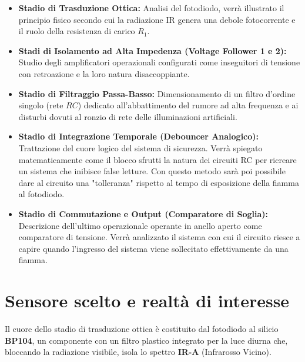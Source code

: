 \documentclass[12pt,a4paper]{article}
\begin{document}
    \begin{itemize}
        \item \textbf{Stadio di Trasduzione Ottica:} Analisi del fotodiodo, verrà illustrato il principio fisico secondo
            cui la radiazione IR genera una debole fotocorrente e il ruolo della resistenza di carico $R_1$.
        
        \item \textbf{Stadi di Isolamento ad Alta Impedenza (Voltage Follower 1 e 2):} Studio degli amplificatori operazionali
            configurati come inseguitori di tensione con retroazione e la loro natura disaccoppiante.
        
        \item \textbf{Stadio di Filtraggio Passa-Basso:} Dimensionamento di un filtro d'ordine singolo (rete $RC$) dedicato
            all'abbattimento del rumore ad alta frequenza e ai disturbi dovuti al ronzio di rete delle illuminazioni artificiali.
        
        \item \textbf{Stadio di Integrazione Temporale (Debouncer Analogico):} Trattazione del cuore logico del sistema di sicurezza.
            Verrà spiegato matematicamente come il blocco sfrutti la natura dei circuiti RC per ricreare un sistema che inibisce false
            letture. Con questo metodo sarà poi possibile dare al circuito una "tolleranza" rispetto al tempo di esposizione della fiamma
            al fotodiodo.
        
        \item \textbf{Stadio di Commutazione e Output (Comparatore di Soglia):} Descrizione dell'ultimo operazionale operante in anello
            aperto come comparatore di tensione. Verrà analizzato il sistema con cui il circuito riesce a capire quando l'ingresso del
            sistema viene sollecitato effettivamente da una fiamma.
    \end{itemize}

\newpage

\section{Sensore scelto e realtà di interesse}
    Il cuore dello stadio di trasduzione ottica è costituito dal fotodiodo al silicio \textbf{BP104}, un componente con un filtro plastico
    integrato per la luce diurna che, bloccando la radiazione visibile, isola lo spettro \textbf{IR-A} (Infrarosso Vicino). 
\end{document}
